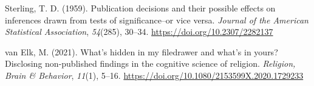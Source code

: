 \documentclass[
  ,jou, a4paper,floatsintext]{apa6}
\newlength{\cslhangindent}
\newlength{\cslentryspacingunit} %
\newenvironment{CSLReferences}[2] %
 {%
  \setlength{\parindent}{0pt}
  \ifodd #1
  \let\oldpar\par
  \def\par{\hangindent=\cslhangindent\oldpar}
  \fi
  \setlength{\parskip}{#2\cslentryspacingunit}
 }%
 {}
\begin{document}
\begin{CSLReferences}{1}{0}
\leavevmode{}%
Sterling, T. D. (1959). Publication decisions and their possible effects on inferences drawn from tests of significance--or vice versa. \emph{Journal of the American Statistical Association}, \emph{54}(285), 30--34. \url{https://doi.org/10.2307/2282137}

\leavevmode{}%
van Elk, M. (2021). What's hidden in my filedrawer and what's in yours? {Disclosing} non-published findings in the cognitive science of religion. \emph{Religion, Brain \& Behavior}, \emph{11}(1), 5--16. \url{https://doi.org/10.1080/2153599X.2020.1729233}

\end{CSLReferences}

\endgroup
\end{document}
